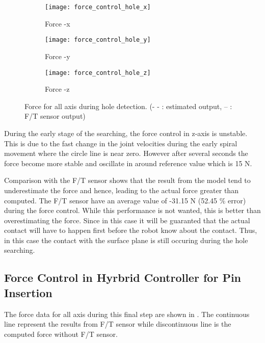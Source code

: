 \begin{figure}[h]
  \begin{subfigure}[t]{0.5\textwidth}
    \centering
    \texttt{[image: force\_control\_hole\_x]} 
    \caption{Force -x}
  \end{subfigure}
  \begin{subfigure}[t]{0.5\textwidth}
    \centering
    \texttt{[image: force\_control\_hole\_y]}
    \caption{Force -y}
  \end{subfigure}
  \begin{subfigure}[t]{0.5\textwidth}
    \centering
    \texttt{[image: force\_control\_hole\_z]}
    \caption{Force -z}
  \end{subfigure}  
  \caption{Force for all axis during hole detection. (- - : estimated output, -- : F/T sensor output)}
  \label{fig:force control hole}
\end{figure}

During the early stage of the searching, the force control in z-axis is unstable. This is due to the fast change in the joint velocities during the early spiral movement where the circle line is near zero. However after several seconds the force become more stable and oscillate in around reference value which is 15 N. 

Comparison with the F/T sensor shows that the result from the model tend to underestimate the force and hence, leading to the actual force greater than computed. The F/T sensor have an average value of -31.15 N (52.45 $\%$ error) during the force control. While this performance is not wanted, this is better than overestimating the force. Since in this case it will be guaranted that the actual contact will have to happen first before the robot know about the contact. Thus, in this case the contact with the surface plane is still occuring during the hole searching.  

\subsection{Force Control in Hyrbrid Controller for Pin Insertion}

The force data for all axis during this final step are shown in . The continuous line represent the results from F/T sensor while discontinuous line is the computed force without F/T sensor.

